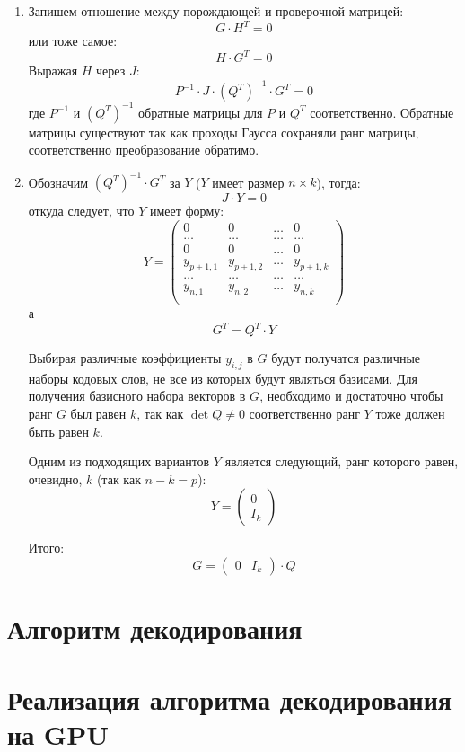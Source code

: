 \begin{enumerate}
 	\item Запишем отношение между порождающей и проверочной матрицей:
 	 \[
 	 	G \cdot H^T = 0
 	 \]
 	 или тоже самое:
 	 \[
 	 	H \cdot G^T = 0
 	 \]
 	 Выражая $H$ через $J$:
 	 \[
 	 	P^{-1} \cdot J \cdot (Q^T)^{-1} \cdot G^T = 0
 	 \]
 	 где $P^{-1}$ и $(Q^T)^{-1}$ обратные матрицы для $P$ и $Q^T$ соответственно. Обратные матрицы существуют
 	 так как проходы Гаусса сохраняли ранг матрицы, соответственно преобразование обратимо.
 	 
 	 \item Обозначим $(Q^T)^{-1} \cdot G^T$ за $Y$ ($Y$ имеет размер $n\times k$), тогда:
 	\[
 		J \cdot Y = 0
 	\]
 	откуда следует, что $Y$ имеет форму:
 	\[
 		Y=\begin{pmatrix}
 			0 & 0 & \ldots & 0 \\
 			\ldots & \ldots & \ldots & \ldots \\
 			0 & 0 & \ldots & 0 \\
 			y_{p+1,1} & y_{p+1,2} & \ldots & y_{p+1,k} \\
 			\ldots & \ldots & \ldots & \ldots \\
 			y_{n,1} & y_{n,2} & \ldots & y_{n,k} \\
 		\end{pmatrix}
 	\]
 	а
 	\[
 	G^T = Q^T \cdot Y
 	\]
 	
 	Выбирая различные коэффициенты $y_{i,j}$ в $G$ будут получатся различные наборы кодовых слов,
 	не все из которых будут являться базисами. Для получения базисного набора векторов в $G$, необходимо
 	и достаточно чтобы ранг $G$ был равен $k$, так как $\det Q \neq 0$ соответственно
 	 ранг $Y$ тоже должен быть равен $k$.
 	
 	Одним из подходящих вариантов $Y$ является следующий, ранг которого равен, 
 	очевидно, $k$ (так как $n - k = p$):
 	\[
 		Y=\begin{pmatrix}
 			0 \\
 			I_k
 		\end{pmatrix}
 	\]
 	
 	Итого:
 	\[
 	G=\begin{pmatrix}
 		0 & I_k
 	\end{pmatrix} \cdot Q
 	\] 
 \end{enumerate}

\section{Алгоритм декодирования}

\section{Реализация алгоритма декодирования на GPU}

